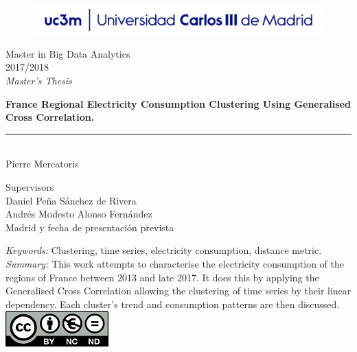 \begin{titlepage}
\begin{sffamily}
\color{azulUC3M}
\begin{center}
\begin{figure}[htb]
\begin{center}
\vspace*{0.6cm}
\includegraphics[width=15cm]{./latex/imagenes/Portada_Logo.png}
\vspace*{1.6cm}
\end{center}
\end{figure}
\begin{LARGE}
Master in Big Data Analytics \\%
2017/2018 \\%
\vspace*{1cm}
\textsl{Master's Thesis}\\
\end{LARGE}
\Huge{\textbf{France Regional Electricity Consumption Clustering Using Generalised Cross Correlation.}} %
\vspace*{1cm}
\rule{80mm}{0.1mm}\\
\huge{Pierre Mercatoris}\\ %
\vspace*{0.5cm}
\begin{Large}
Supervisors\\

Daniel Peña Sánchez de Rivera\\
Andrés Modesto Alonso Fernández\\
Madrid y fecha de presentación prevista\\
\end{Large}
\end{center}
\vspace*{2cm}
\color{black}
\emph{Keywords:} Clustering, time series, electricity consumption, distance metric. \\
\emph{Summary:} This work attempts to characterise the electricity consumption
of the regions of France between 2013 and late 2017. It does this by applying
the Generalised Cross Correlation allowing the clustering of time series by
their linear dependency. Each cluster's trend and consumption patterns are then discussed.\\
\includegraphics{./latex/imagenes/creativecommons.png}\\


\end{sffamily}
\end{titlepage}

